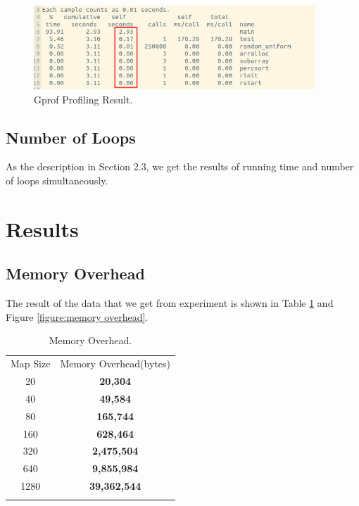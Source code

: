 \documentclass{article}
\begin{document}
\begin{figure}[H]
  \centering
  \centerline{\includegraphics[width=300pt]{3.png}}
  \caption{Gprof Profiling Result.}
\label{figure:gprof}
\end{figure}

\subsection{Number of Loops}

As the description in Section 2.3, we get the results of running time and number of loops simultaneously.

\section{Results}
\subsection{Memory Overhead}
The result of the data that we get from experiment is shown in Table \ref{table:memory overhead} and Figure \ref{figure:memory overhead}.

\begin{table}[H]
\scriptsize
\centering
\label{table:memory overhead}
\begin{tabular}{c|c}%
\hline\noalign{\smallskip}
Map Size & Memory Overhead(bytes)\\
\noalign{\smallskip}\hline\noalign{\smallskip}
20 & \textbf{20,304}\\
40 & \textbf{49,584}\\
80 & \textbf{165,744}\\
160 & \textbf{628,464}\\
320 & \textbf{2,475,504}\\
640 & \textbf{9,855,984}\\
1280 & \textbf{39,362,544}\\
\noalign{\smallskip}\hline
\end{tabular}
\caption{Memory Overhead.}
\end{table}
\end{document}
